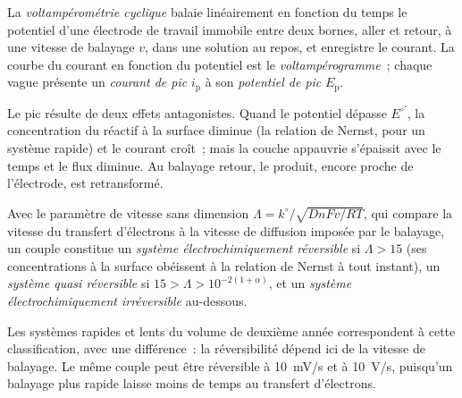 \begin{definition}\label{def:b3:electrode-kinetics:cv}
La \emph{voltampérométrie cyclique} balaie
linéairement en fonction du temps le potentiel d'une électrode de travail
immobile entre deux bornes, aller et retour, à une vitesse de balayage
$v$, dans une solution au repos, et enregistre le courant. La courbe du
courant en fonction du potentiel est le
\emph{voltampérogramme}~; chaque
vague présente un \emph{courant de pic} $i_{\mathrm p}$ à son \emph{potentiel de pic}
$E_{\mathrm p}$.
\end{definition}

Le pic résulte de deux effets antagonistes. Quand le potentiel dépasse
$E^{\circ\prime}$, la concentration du réactif à la surface diminue (la
relation de Nernst, pour un système rapide) et le courant croît~; mais la
couche appauvrie s'épaissit avec le temps et le flux diminue. Au
balayage retour, le produit, encore proche de l'électrode, est
retransformé.

\begin{definition}[Réversibilité]\label{def:b3:electrode-kinetics:reversibility}
Avec le paramètre de vitesse sans dimension $\Lambda = k^\circ/\sqrt{DnFv/RT}$, qui compare
la vitesse du transfert d'électrons à la vitesse de diffusion imposée par
le balayage, un couple constitue un
\emph{système électrochimiquement réversible}
si $\Lambda > 15$ (ses concentrations à la surface obéissent à la
relation de Nernst à tout instant), un \emph{système quasi
réversible} si $15 >
\Lambda > 10^{-2(1 + \alpha)}$, et un \emph{système électrochimiquement
irréversible}
au-dessous.
\end{definition}

\begin{remark}
Les systèmes rapides et lents du volume de deuxième année correspondent à
cette classification, avec une différence~: la réversibilité dépend ici
de la vitesse de balayage. Le même couple peut être réversible à
\qty{10}{mV/s} et  à
\qty{10}{V/s}, puisqu'un balayage plus rapide laisse moins de temps au
transfert d'électrons.
\end{remark}

